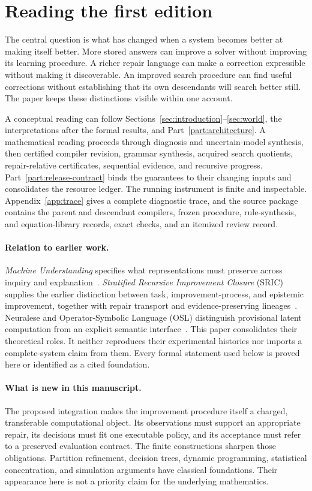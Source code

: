\documentclass[11pt,letterpaper]{article}
\theoremstyle{plain}
\theoremstyle{definition}
\begin{document}
\section*{Reading the first edition}
The central question is what has changed when a system becomes better at making itself better. More stored answers can improve a solver without improving its learning procedure. A richer repair language can make a correction expressible without making it discoverable. An improved search procedure can find useful corrections without establishing that its own descendants will search better still. The paper keeps these distinctions visible within one account.

A conceptual reading can follow Sections~\ref{sec:introduction}--\ref{sec:world}, the interpretations after the formal results, and Part~\ref{part:architecture}. A mathematical reading proceeds through diagnosis and uncertain-model synthesis, then certified compiler revision, grammar synthesis, acquired search quotients, repair-relative certificates, sequential evidence, and recursive progress. Part~\ref{part:release-contract} binds the guarantees to their changing inputs and consolidates the resource ledger. The running instrument is finite and inspectable. Appendix~\ref{app:trace} gives a complete diagnostic trace, and the source package contains the parent and descendant compilers, frozen procedure, rule-synthesis, and equation-library records, exact checks, and an itemized review record.

\paragraph{Relation to earlier work.}
\emph{Machine Understanding} specifies what representations must preserve across inquiry and explanation~\cite{understanding}. \emph{Stratified Recursive Improvement Closure} (SRIC) supplies the earlier distinction between task, improvement-process, and epistemic improvement, together with repair transport and evidence-preserving lineages~\cite{sric}. Neuralese and Operator-Symbolic Language (OSL) distinguish provisional latent computation from an explicit semantic interface~\cite{neuralese,osl}. This paper consolidates their theoretical roles. It neither reproduces their experimental histories nor imports a complete-system claim from them. Every formal statement used below is proved here or identified as a cited foundation.

\paragraph{What is new in this manuscript.}
The proposed integration makes the improvement procedure itself a charged, transferable computational object. Its observations must support an appropriate repair, its decisions must fit one executable policy, and its acceptance must refer to a preserved evaluation contract. The finite constructions sharpen those obligations. Partition refinement, decision trees, dynamic programming, statistical concentration, and simulation arguments have classical foundations. Their appearance here is not a priority claim for the underlying mathematics.
\end{document}
